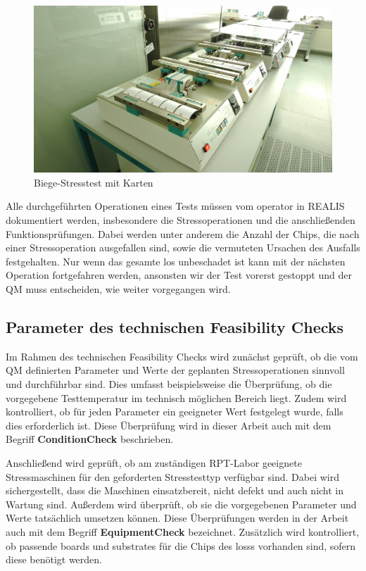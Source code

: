 \begin{figure}[!htbp]
    \centering
    \includegraphics[width=1\textwidth]{bilder/stresstest-card1.png}
    \caption{Biege-Stresstest mit Karten \cite{RPTLaborIntern}}
    \label{fig:stresstest-card}
\end{figure}

Alle durchgeführten Operationen eines Tests müssen vom \gls{operator} in \gls{REALIS} dokumentiert werden, insbesondere die Stressoperationen und die anschließenden Funktionsprüfungen. Dabei werden unter anderem die Anzahl der Chips, die nach einer Stressoperation ausgefallen sind, sowie die vermuteten Ursachen des Ausfalls festgehalten.
Nur wenn das gesamte \gls{los} unbeschadet ist kann mit der nächsten Operation fortgefahren werden, ansonsten wir der Test vorerst gestoppt und der \gls{QM} muss entscheiden, wie weiter vorgegangen wird.

\subsection{Parameter des technischen Feasibility Checks}\label{Subsec:ParameterdestechnischenFeasibilityChecks}

Im Rahmen des technischen Feasibility Checks wird zunächst geprüft, ob die vom \gls{QM} definierten Parameter und Werte der geplanten Stressoperationen sinnvoll und durchführbar sind. Dies umfasst beispielsweise die Überprüfung, ob die vorgegebene Testtemperatur im technisch möglichen Bereich liegt. Zudem wird kontrolliert, ob für jeden Parameter ein geeigneter Wert festgelegt wurde, falls dies erforderlich ist. Diese Überprüfung wird in dieser Arbeit auch mit dem Begriff \textbf{\gls{ConditionCheck}} beschrieben.

Anschließend wird geprüft, ob am zuständigen \gls{RPT}-Labor geeignete Stressmaschinen für den geforderten Stresstesttyp verfügbar sind. Dabei wird sichergestellt, dass die Maschinen einsatzbereit, nicht defekt und auch nicht in Wartung sind. Außerdem wird überprüft, ob sie die vorgegebenen Parameter und Werte tatsächlich umsetzen können. Diese Überprüfungen werden in der Arbeit auch mit dem Begriff \textbf{\gls{EquipmentCheck}} bezeichnet.
Zusätzlich wird kontrolliert, ob passende \glspl{board} und \glspl{substrate} für die Chips des \glspl{los}s vorhanden sind, sofern diese benötigt werden.


